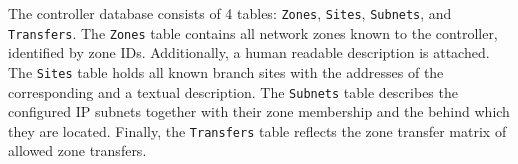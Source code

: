 The controller database consists of 4 tables: \texttt{Zones}, \texttt{Sites}, \texttt{Subnets}, 
and \texttt{Transfers}. The \texttt{Zones} table contains all network zones known to the 
controller, identified by zone IDs. Additionally, a human readable description is attached. The 
\texttt{Sites} table holds all known branch sites with the addresses of the corresponding \tps 
and a textual description. The \texttt{Subnets} table describes the configured IP subnets 
together with their zone membership and the \tp behind which they are located. Finally, the 
\texttt{Transfers} table reflects the zone transfer matrix of allowed zone transfers.